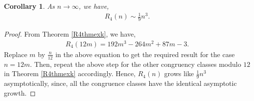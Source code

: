 \documentclass[12pt,reqno]{amsart}
\numberwithin{equation}{section}
\theoremstyle{plain}
\newtheorem{corollary}[theorem]{Corollary}
\begin{document}
	\begin{corollary}\label{CorR4G}
		As $n \to \infty$, we have,
		\begin{align*}
			R_4(n) \sim \frac{1}{9}n^3.
		\end{align*}
	\end{corollary}
	\begin{proof}
		From Theorem \ref{R4thmexk}, we have,
		\begin{align*}
			R_4(12m) =192m^3 - 264m^2 + 87m -3.
		\end{align*}
		Replace $m$ by $\frac{n}{12}$ in the above equation to get the required result for the case $n=12m$. Then, repeat the above step for the other congruency classes modulo $12$ in Theorem \ref{R4thmexk} accordingly. Hence, $R_4(n)$ grows like $\frac{1}{9}n^3$ asymptotically, since, all the congruence classes have the identical asymptotic growth. 
	\end{proof}
\end{document}
